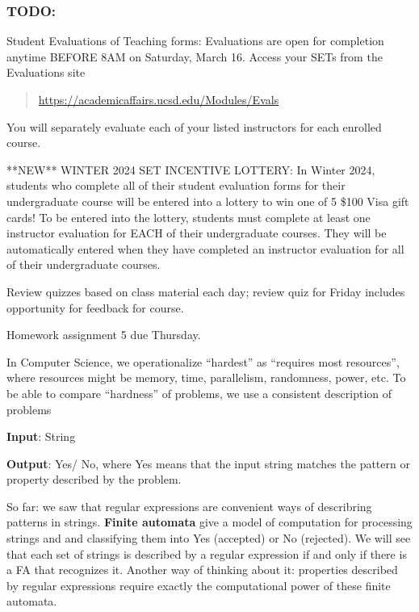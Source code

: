 \subsubsection*{TODO:}
\begin{list}
   {\itemsep2pt}
   \item Student Evaluations of Teaching forms: Evaluations are open for completion anytime BEFORE 8AM on Saturday, March 16.
    Access your SETs from the Evaluations site
    \begin{quote}
         \url{https://academicaffairs.ucsd.edu/Modules/Evals}
    \end{quote}
    You will separately evaluate each of your listed instructors for each enrolled course. 

    **NEW** WINTER 2024 SET INCENTIVE LOTTERY: In Winter 2024, students who complete all of their student 
    evaluation forms for their undergraduate course will be entered into a lottery to win one of 
    5 \$100 Visa gift cards! To be entered into the lottery, students must complete at 
    least one instructor evaluation for EACH of their undergraduate courses. 
    They will be automatically entered when they have completed an instructor evaluation for 
    all of their undergraduate courses.

   \item Review quizzes based on class material each day; review quiz for Friday includes opportunity for feedback for course.
   \item Homework assignment 5 due Thursday.
\end{list}



\newpage


In Computer Science, we operationalize ``hardest'' as ``requires most resources'', where
resources might be memory, time, parallelism, randomness, power, etc.
To be able to compare ``hardness'' of problems, we use a consistent description of problems

{\bf Input}: String

{\bf Output}: Yes/ No, where Yes means that the input string matches the pattern or property described by the problem.

So far: we saw that regular expressions are convenient ways of describring patterns in strings.
{\bf Finite automata} give a model of computation for processing strings and and classifying them into Yes (accepted)
or No (rejected). We will see that each set of strings is described by a regular expression if and only 
if there is a FA that recognizes it.  Another way of thinking about it: properties described by regular
expressions require exactly the computational power of these finite automata.



